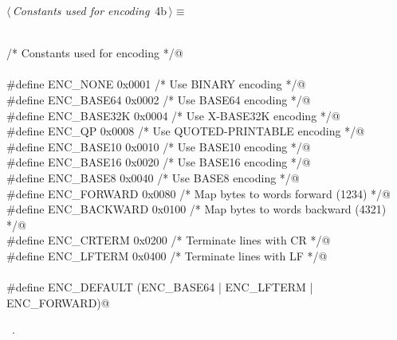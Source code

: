 \documentclass[10pt,a4paper,twoside,notitlepage]{article}
\begin{document}
\begin{flushleft} \small\label{scrap4}\raggedright\small
{} $\langle\,${\itshape Constants used for encoding}\nobreak\ {\footnotesize {4b}}$\,\rangle\equiv$
\vspace{-1ex}
\begin{list}{}{} \item
\mbox{}\verb@@\\
\mbox{}\verb@  /* Constants used for encoding */@\\
\mbox{}\verb@@\\
\mbox{}\verb@#define ENC_NONE        0x0001  /* Use BINARY encoding                 */@\\
\mbox{}\verb@#define ENC_BASE64      0x0002  /* Use BASE64 encoding                 */@\\
\mbox{}\verb@#define ENC_BASE32K     0x0004  /* Use X-BASE32K encoding              */@\\
\mbox{}\verb@#define ENC_QP          0x0008  /* Use QUOTED-PRINTABLE encoding       */@\\
\mbox{}\verb@#define ENC_BASE10      0x0010  /* Use BASE10 encoding                 */@\\
\mbox{}\verb@#define ENC_BASE16      0x0020  /* Use BASE16 encoding                 */@\\
\mbox{}\verb@#define ENC_BASE8       0x0040  /* Use BASE8  encoding                 */@\\
\mbox{}\verb@#define ENC_FORWARD     0x0080  /* Map bytes to words forward (1234)   */@\\
\mbox{}\verb@#define ENC_BACKWARD    0x0100  /* Map bytes to words backward (4321)  */@\\
\mbox{}\verb@#define ENC_CRTERM      0x0200  /* Terminate lines with CR             */@\\
\mbox{}\verb@#define ENC_LFTERM      0x0400  /* Terminate lines with LF             */@\\
\mbox{}\verb@@\\
\mbox{}\verb@#define ENC_DEFAULT (ENC_BASE64 | ENC_LFTERM | ENC_FORWARD)@\\
\mbox{}\verb@@{\NWsep}
\end{list}
\vspace{-1.5ex}
\footnotesize
\begin{list}{}{\setlength{\itemsep}{-\parsep}\setlength{\itemindent}{-\leftmargin}}
\item \NWtxtMacroRefIn\ .

\item{}
\end{list}
\vspace{4ex}
\end{flushleft}
\end{document}
